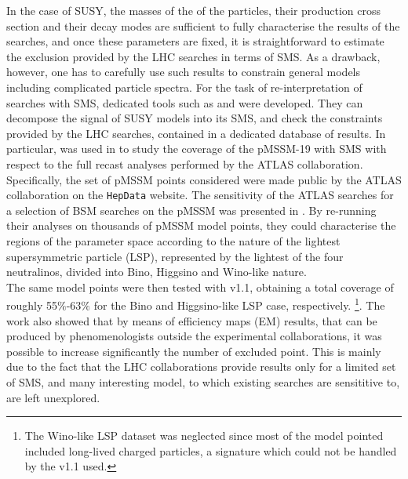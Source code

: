 \documentclass[epj,nopacs,fleqn]{svjour}
\begin{document}
In the case of SUSY, the masses of the of the particles, their production cross section and their decay modes are sufficient to fully characterise the results of the searches, and once these parameters are fixed, it is straightforward to estimate the exclusion provided by the LHC searches in terms of SMS. As a drawback, however, one has to carefully use such results to constrain general models including complicated particle spectra. For the task of re-interpretation of searches with SMS, 
dedicated tools such as \FASTLIM\cite{Papucci:2014rja} and \SMO\cite{Kraml:2014sna} were developed. They can decompose the signal of SUSY models into its SMS, and check the constraints provided by the LHC searches, contained in a dedicated database of results. In particular, \SMO was used in \cite{Ambrogi:2017lov} to study the coverage of the pMSSM-19 with SMS with respect to the full recast analyses performed by the ATLAS collaboration. Specifically, the set of pMSSM points considered were made public by the ATLAS collaboration on the \texttt{HepData} website\cite{ATLASpMSSMhepdata}. The sensitivity of the ATLAS searches for a selection of BSM searches on the pMSSM was presented in \cite{2015baa}. By re-running their analyses on thousands of pMSSM model points, they could characterise the  regions of the parameter space according to the nature of the lightest supersymmetric particle (LSP), represented by the lightest of the four neutralinos, divided into Bino, Higgsino and Wino-like nature. 
\\
The same model points were then tested with \SMO v1.1\cite{Ambrogi:2017neo}, obtaining a total coverage of roughly 55$\%$-63$\%$ for the Bino and Higgsino-like LSP case, respectively. \footnote{The Wino-like LSP dataset was neglected since most of the model pointed included long-lived charged particles, a signature which could not be handled by the v1.1 used.}. The work also showed that by means of efficiency maps (EM) results, that can be produced by phenomenologists outside the experimental collaborations, it was possible to increase significantly the number of excluded point. This is mainly due to the fact that the LHC collaborations provide results only for a limited set of SMS, and many interesting model, to which existing searches are sensititive to, are left unexplored.
\\
\end{document}
